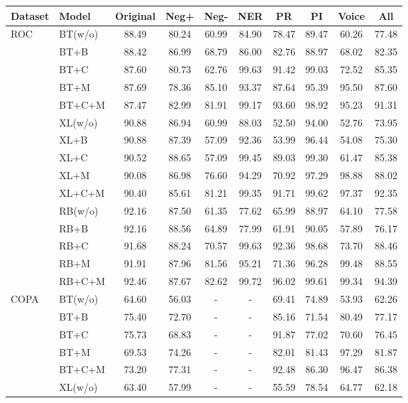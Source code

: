 \begin{table}[th]
\scriptsize
\centering
\begin{tabular}{ll|c|ccccccc}\hline
\toprule  
\textbf{Dataset}&\textbf{Model}&\textbf{Original} &\textbf{Neg+} & \textbf{Neg-} &\textbf{NER} &\textbf{PR} &\textbf{PI}&\textbf{Voice}&\textbf{All}
                                               \\ 
 \hline
 \multirow{15}{*}{ROC} 
&BT(w/o)&88.49 &80.24 &60.99 &84.90 &78.47 &89.47 &60.26 &77.48 \\ 
&BT+B&88.42 &86.99 &68.79 &86.00 &82.76 &88.97 &68.02 &82.35 \\ 
&BT+C&87.60 &80.73 &62.76 &99.63 &91.42 &99.03 &72.52 &85.35 \\ 
&BT+M&87.69 &78.36 &85.10 &93.37 &87.64 &95.39 &95.50 &87.60 \\ 
&BT+C+M&87.47 &82.99 &81.91 &99.17 &93.60 &98.92 &95.23 &91.31 \\ 
\cline{2-10}
&XL(w/o)&90.88 &86.94 &60.99 &88.03 &52.50 &94.00 &52.76 &73.95 \\ 
&XL+B&90.88 &87.39 &57.09 &92.36 &53.99 &96.44 &54.08 &75.30 \\ 
&XL+C&90.52 &88.65 &57.09 &99.45 &89.03 &99.30 &61.47 &85.38 \\ 
&XL+M&90.08 &86.98 &76.60 &94.29 &70.92 &97.29 &98.88 &88.02 \\ 
&XL+C+M&90.40 &85.61 &81.21 &99.35 &91.71 &99.62 &97.37 &92.35 \\ 
\cline{2-10}
&RB(w/o)&92.16 &87.50 &61.35 &77.62 &65.99 &88.97 &64.10 &77.58 \\ 
&RB+B&92.16 &88.56 &64.89 &77.99 &61.91 &90.05 &57.89 &76.17 \\ 
&RB+C&91.68 &88.24 &70.57 &99.63 &92.36 &98.68 &73.70 &88.46 \\ 
&RB+M&91.91 &87.96 &81.56 &95.21 &71.36 &96.28 &99.48 &88.55 \\ 
&RB+C+M&92.46 &87.67 &82.62 &99.72 &96.02 &99.61 &99.34 &94.39 \\ 
\hline
\multirow{15}{*}{COPA} 
&BT(w/o)&64.60 &56.03 &-&-&69.41 &74.89 &53.93 &62.26 \\ 
&BT+B&75.40 &72.70 &-&-&85.16 &71.54 &80.49 &77.17 \\ 
&BT+C&75.73 &68.83 &-&-&91.87 &77.02 &70.60 &76.45 \\ 
&BT+M&69.53 &74.26 &-&-&82.01 &81.43 &97.29 &81.87 \\ 
&BT+C+M&73.20 &77.31 &-&-&92.48 &86.30 &96.47 &86.38 \\ 
\cline{2-10}
&XL(w/o)&63.40 &57.99 &-&-&55.59 &78.54 &64.77 &62.18 \\ 

\end{tabular}
\end{table}
